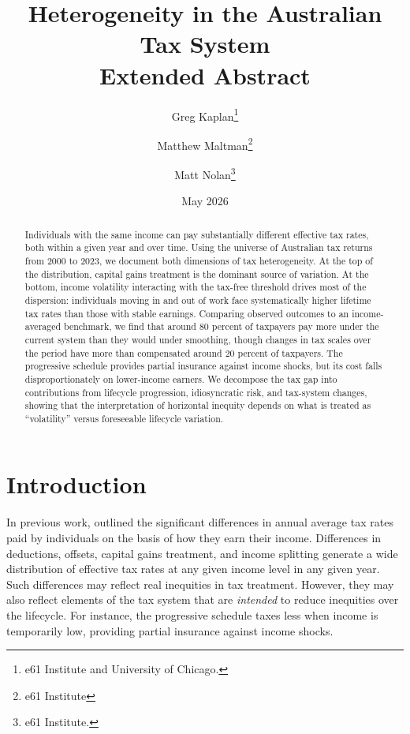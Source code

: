 \documentclass[12pt,a4paper]{article}
\title{\textbf{Heterogeneity in the Australian Tax System} \\ \bigskip \large Extended Abstract}
\author{Greg Kaplan\thanks{e61 Institute and University of Chicago.} \and Matthew Maltman\thanks{e61 Institute} \and Matt Nolan\thanks{e61 Institute.}}
\date{May 2026}
\begin{document}
\maketitle

\vfill
\begin{abstract}
\noindent Individuals with the same income can pay substantially different effective tax rates, both within a given year and over time. Using the universe of Australian tax returns from 2000 to 2023, we document both dimensions of tax heterogeneity. At the top of the distribution, capital gains treatment is the dominant source of variation. At the bottom, income volatility interacting with the tax-free threshold drives most of the dispersion: individuals moving in and out of work face systematically higher lifetime tax rates than those with stable earnings. Comparing observed outcomes to an income-averaged benchmark, we find that around 80 percent of taxpayers pay more under the current system than they would under smoothing, though changes in tax scales over the period have more than compensated around 20 percent of taxpayers. The progressive schedule provides partial insurance against income shocks, but its cost falls disproportionately on lower-income earners. We decompose the tax gap into contributions from lifecycle progression, idiosyncratic risk, and tax-system changes, showing that the interpretation of horizontal inequity depends on what is treated as ``volatility'' versus foreseeable lifecycle variation.
\end{abstract}

\vfill
\newpage
\section{Introduction}

In previous work, \citet{KaplanMaltmanNolan2025} outlined the significant differences in annual average tax rates paid by individuals on the basis of how they earn their income. Differences in deductions, offsets, capital gains treatment, and income splitting generate a wide distribution of effective tax rates at any given income level in any given year. Such differences may reflect real inequities in tax treatment. However, they may also reflect elements of the tax system that are \emph{intended} to reduce inequities over the lifecycle. For instance, the progressive schedule taxes less when income is temporarily low, providing partial insurance against income shocks.
\end{document}
